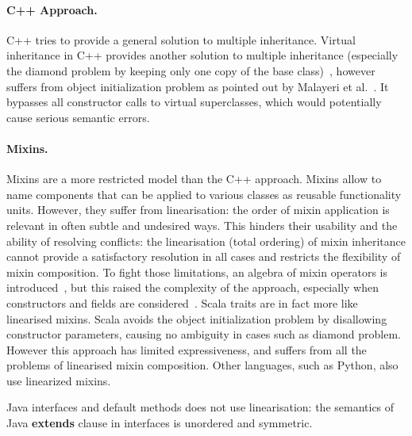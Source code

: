 \paragraph{C++ Approach.}
C++ tries to provide a general solution to multiple inheritance. Virtual
inheritance in C++ provides another solution to multiple inheritance (especially
the diamond problem by keeping only one copy of the base
class)~\cite{ellis1990annotated}, however suffers from object initialization
problem as pointed out by Malayeri et al.~\cite{malayeri2009cz}. It bypasses all
constructor calls to virtual superclasses, which would potentially cause serious
semantic errors. 

\paragraph{Mixins.}
Mixins are a more restricted model than the C++ approach. Mixins allow to name
components that can be applied to various classes as reusable functionality
units. However, they suffer from linearisation: the order of mixin application
is relevant in often subtle and undesired ways. This hinders their usability
and the ability of resolving conflicts: the linearisation (total ordering) of
mixin inheritance cannot provide a satisfactory resolution in all cases and
restricts the flexibility of mixin composition. To fight those limitations, an
algebra of mixin operators is introduced~\cite{ancona2002calculus}, but this
raised the complexity of the approach, especially when constructors and fields
are considered~\cite{marco09FJigsaw}. Scala traits are in fact more like linearised mixins.
Scala avoids the object initialization
problem by disallowing constructor parameters, causing no ambiguity in cases
such as diamond problem. However this approach has limited expressiveness, and
suffers from all the problems of linearised mixin composition. Other languages, such as 
Python, also use linearized mixins.
\begin{comment}
Python also offers multiple inheritance via linearised mixins. Indeed in python any class is implicitly a mixin, and mixin composition informally expressed as\\*
\Q@ class A use B,C {...new methods...}@\\*
can be expressed in python as \\*
\Q@ class Aux: ...new methods...@\\*
\Q@ class A(B,C,Aux): pass@ 
\end{comment}
\noindent Java interfaces and default methods does not use
linearisation: the semantics of Java \textbf{extends} clause in
interfaces is unordered and symmetric.

